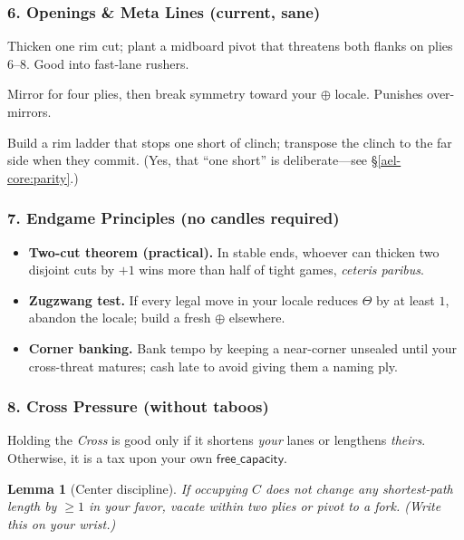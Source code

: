 \documentclass[11pt]{article}
\numberwithin{equation}{section} %
\theoremstyle{plain} %
\newtheorem{lemma}[theorem]{Lemma}
\theoremstyle{definition} %
\theoremstyle{remark} %
\begin{document}
\subsubsection{6. Openings \& Meta Lines (current, sane)}
\begin{description}\setlength\itemsep{0.35em}
  \item[\textit{Cage \& Pivot.}] Thicken one rim cut; plant a midboard pivot that threatens both flanks on plies 6--8. Good into fast-lane rushers.
  \item[\textit{Mirror--Then--Shiver.}] Mirror for four plies, then break symmetry toward your \(\oplus\) locale. Punishes over-mirrors.
  \item[\textit{Ladder--to--Ladder.}] Build a rim ladder that stops one short of clinch; transpose the clinch to the far side when they commit. (Yes, that ``one short'' is deliberate---see \S\ref{ael-core:parity}.)
\end{description}

\subsubsection{7. Endgame Principles (no candles required)}
\begin{itemize}\setlength\itemsep{0.25em}
  \item \textbf{Two-cut theorem (practical).} In stable ends, whoever can thicken two disjoint cuts by \(+1\) wins more than half of tight games, \emph{ceteris paribus}.
  \item \textbf{Zugzwang test.} If every legal move in your locale reduces \(\Theta\) by at least \(1\), abandon the locale; build a fresh \(\oplus\) elsewhere.
  \item \textbf{Corner banking.} Bank tempo by keeping a near-corner unsealed until your cross-threat matures; cash late to avoid giving them a naming ply.
\end{itemize}

\subsubsection{8. Cross Pressure (without taboos)}
\label{ael-core:cross}
Holding the \emph{Cross} is good only if it shortens \emph{your} lanes or lengthens \emph{theirs}. Otherwise, it is a tax upon your own \(\mathsf{free\_capacity}\).

\begin{lemma}[Center discipline]
If occupying \(C\) does not change any shortest-path length by \(\geq 1\) in your favor, vacate within two plies or pivot to a fork. (Write this on your wrist.)
\end{lemma}
\end{document}
